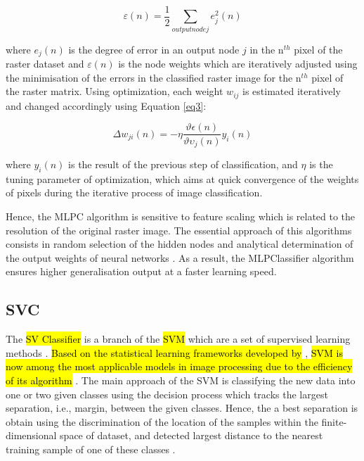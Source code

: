 \documentclass[final,5p,times,twocolumn]{elsarticle}
\numberwithin{table}{section}
\begin{document}
\begin{equation}
\varepsilon(n)=\frac{1}{2} \sum_{output node j}{e_{j}^2(n)}
\label{eq2}
\end{equation}

where $e_j(n)$ is the degree of error in an output node $j$ in the n$^{th}$  pixel of the raster dataset and $\varepsilon(n)$ is the node weights which are iteratively adjusted using the minimisation of the errors in the classified raster image for the n$^{th}$ pixel of the raster matrix. Using optimization, each weight $w_{ij}$ is estimated iteratively and changed accordingly using Equation \ref{eq3}: 

\begin{equation}
\Delta w_{ji}(n)=-\eta\frac{\vartheta\epsilon(n)}{\vartheta\upsilon_{j}(n)}y_{i}(n)
\label{eq3}
\end{equation}

where $y_{i}(n)$ is the result of the previous step of classification, and $\eta$ is the tuning parameter of optimization, which aims at quick convergence of the weights of pixels during the iterative process of image classification.

Hence, the MLPC algorithm is sensitive to feature scaling which is related to the resolution of the original raster image. The essential approach of this algorithms consists in random selection of the hidden nodes and analytical determination of the output weights of neural networks \cite{HUANG2006489}. As a result, the MLPClassifier algorithm ensures higher generalisation output at a faster learning speed. 

\subsection{SVC}

The \hl{SV Classifier} is a branch of the \hl{SVM} which are a set of supervised learning methods \cite{Cortes}. \hl{Based on the statistical learning frameworks developed by} \cite{Vapnik}, \hl{SVM is now among the most applicable models in image processing due to the efficiency of its algorithm} \cite{chandra2021survey}. The main approach of the SVM is classifying the new data into one or two given classes using the decision process which tracks the largest separation, i.e., margin, between the given classes. Hence, the a best separation is obtain using the discrimination of the location of the samples within the finite-dimensional space of dataset, and detected largest distance to the nearest training sample of one of these classes \cite{6069282,earth5030024}.
\end{document}
